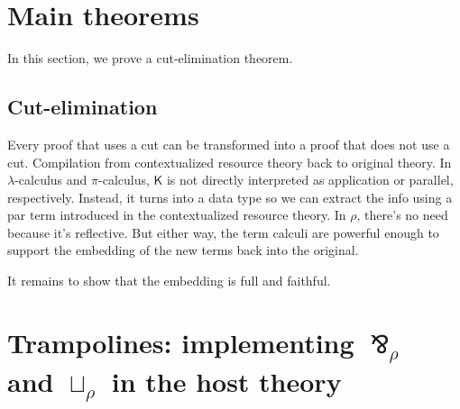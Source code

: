 \documentclass{llncs}
\renewcommand{\:}{\colon}
\newcommand{\pic}{$\pi$-calculus}
\newcommand{\lamc}{$\lambda$-calculus}
\begin{document}








\section{Main theorems}
In this section, we prove a cut-elimination theorem.
\subsection{Cut-elimination}
Every proof that uses a cut can be transformed into a proof that does
not use a cut.  Compilation from contextualized resource theory back
to original theory. In {\lamc} and {\pic}, $\mathsf{K}$ is
not directly interpreted as application or parallel,
respectively. Instead, it turns into a data type so we can extract the
info using a par term introduced in the contextualized resource
theory.  In $\rho$, there's no need because it's reflective.  But either
way, the term calculi are powerful enough to support the embedding of
the new terms back into the original.

It remains to show that the embedding is full and faithful. 

\section{Trampolines: implementing $\bindnasrepma_{\rho}$ and $\sqcup_{\rho}$ in the host theory}
\end{document}
